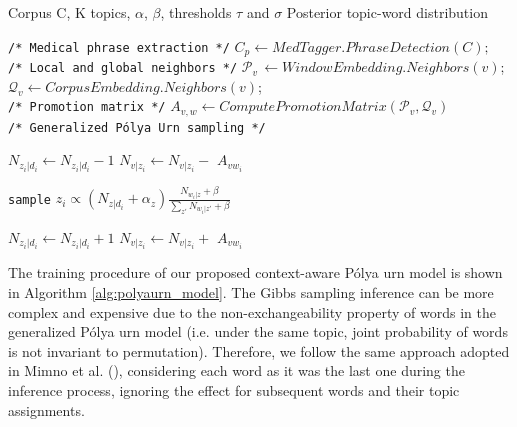 \documentclass[letterpaper]{article}
\begin{document}
\begin{algorithm}[htb]
\begin{algorithmic}[1]
\caption{Training procedure of the context-aware P\'{o}lya urn model.}
\label{alg:polyaurn_model}
\Require Corpus C, K topics, $\alpha$, $\beta$, thresholds $\tau$ and $\sigma$
\Ensure Posterior topic-word distribution

\State \texttt{/* Medical phrase extraction */}
\State $C_p \leftarrow MedTagger.PhraseDetection(C);$ \\

\State  \texttt{/* Local and global neighbors */}
	\State $\mathcal{P}_{v}\, \leftarrow  WindowEmbedding.Neighbors(v)$;
    \State $\mathcal{Q}_{v} \leftarrow  CorpusEmbedding.Neighbors(v)$;
\EndFor \\

\State \texttt{/* Promotion matrix */}
\State $\mathit{A_{v,w}} \leftarrow ComputePromotionMatrix(\mathcal{P}_{v}, \mathcal{Q}_{v})$ \\

\State \texttt{/* Generalized P\'{o}lya Urn sampling */}
{}

        \State $N_{z_i|d_i} \leftarrow N_{z_i|d_i} - 1 $
        	\State $N_{v|z_i} \leftarrow N_{v|z_i} -$ \textbf{\textit{$A_{vw_{i}}$}}
    	\EndFor
    \EndFor

	\State \texttt{sample} $z_i \propto (N_{z|d_i} + \alpha_z) \frac{N_{w_i|z} + \beta}{\sum_{z'}^{} N_{w_i|z'} + \beta}$

        \State $N_{z_i|d_i} \leftarrow N_{z_i|d_i} + 1 $
        	\State $N_{v|z_i} \leftarrow N_{v|z_i} +$ \textbf{\textit{$A_{vw_{i}}$}}  %
    	\EndFor
    \EndFor
\EndFor

\end{algorithmic}
\end{algorithm}

The training procedure of our proposed context-aware P\'{o}lya urn model is shown in Algorithm \ref{alg:polyaurn_model}. %
The Gibbs sampling inference can be more complex and expensive due to the non-exchangeability property of words in the generalized P\'{o}lya urn model (i.e. under the same topic, joint probability of words is not invariant to permutation). Therefore, we follow the same approach adopted in Mimno et al. (\citeyear{Mimno11}), considering each word as it was the last one during the inference process, ignoring the effect for subsequent words and their topic assignments.
\end{document}
